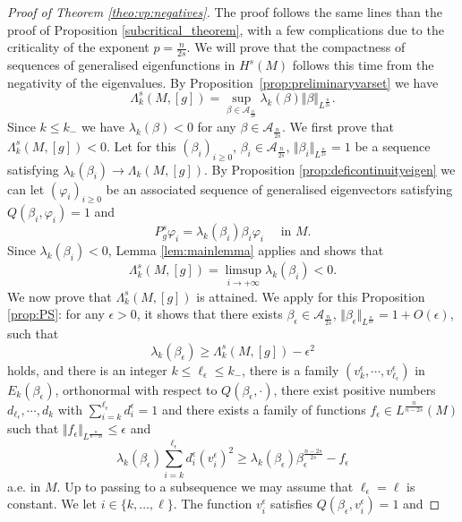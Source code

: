 \documentclass[10pt]{amsart}
\numberwithin{equation}{section}
\newcommand{\vp}{\varphi}
\theoremstyle{plain}
\theoremstyle{remark}
\begin{document}
\begin{proof}[Proof of Theorem \ref{theo:vp:negatives}]
The proof follows the same lines than the proof of Proposition \ref{subcritical_theorem}, with a few complications due to the criticality of the exponent $p = \frac{n}{2s}$. We will prove that the compactness of sequences of generalised eigenfunctions in $H^s(M)$ follows this time from the negativity of the eigenvalues. By Proposition~\ref{prop:preliminaryvarset} we have 
$$ \Lambda_k^s(M,[g]) = \sup_{\beta \in \mathcal{A}_{\frac{n}{2s}}} \lambda_k(\beta) \Vert \beta \Vert_{L^\frac{n}{2s}}. $$
Since $k \le k_{-}$ we have $\lambda_k(\beta) <0$ for any $\beta \in \mathcal{A}_{\frac{n}{2s}}$.  We first prove that $\Lambda_k^s(M,[g])<0$. Let for this $(\beta_i)_{i \ge0}$, $\beta_i \in \mathcal{A}_{\frac{n}{2s}}$, $\Vert \beta_i \Vert_{L^{\frac{n}{2s}}}=1$ be a sequence satisfying $ \lambda_k(\beta_i) \to \Lambda_k(M,[g])$. By Proposition \ref{prop:deficontinuityeigen} we can let $(\vp_i)_{i\ge0}$ be an associated sequence of generalised eigenvectors satisfying $Q(\beta_i, \vp_i) = 1$ and 
$$ P_g^s \vp_i = \lambda_k(\beta_i) \beta_i \vp_i \quad \text{ in } M. $$
Since $\lambda_k(\beta_i) <0$, Lemma \ref{lem:mainlemma} applies and shows that 
$$\Lambda_k^s(M,[g]) = \limsup_{i \to + \infty} \lambda_k(\beta_i) <0.$$ 
We now prove that $\Lambda_k^s(M,[g])$ is attained. We apply for this Proposition \ref{prop:PS}: for any $\epsilon >0$, it shows that there exists $\beta_\epsilon \in \mathcal{A}_{\frac{n}{2s}}$, $\Vert \beta_\epsilon \Vert_{L^\frac{n}{2s}} = 1 + O(\epsilon)$, such that  
\begin{equation} \label{eq:vp:neg:1}
 \lambda_k(\beta_{\epsilon}) \geq  \Lambda_k^s(M,[g]) - \epsilon^2 
 \end{equation}
holds, and there is an integer $k \le \ell_\epsilon \leq k_-$, there is a family $(v_{k}^\epsilon,\cdots,v_{\ell_\epsilon}^\epsilon) $ in $E_k(\beta_\epsilon)$, orthonormal with respect to $Q(\beta_\epsilon,\cdot)$, there exist positive numbers $d_{\ell_\epsilon},\cdots, d_k$ with $\sum_{i=k}^{\ell_\epsilon} d_i^\epsilon = 1$ and there exists a family of functions $f_\epsilon \in L^{\frac{n}{n-2s}}(M)$ such that $ \Vert f_\epsilon \Vert_{L^{\frac{n}{n-2s}}} \leq \epsilon $ and
\begin{equation} \label{eq:vp:neg:2} 
 \lambda_k(\beta_\epsilon) \sum_{i=k}^{\ell_\epsilon} d_i^\epsilon \left(v_i^\epsilon\right)^2 \geq \lambda_k(\beta_\epsilon)\beta_\epsilon^{\frac{n-2s}{2s}} - f_\epsilon 
 \end{equation}
 a.e. in $M$. Up to passing to a subsequence we may assume that $\ell_\epsilon = \ell$ is constant. We let $i \in \{k, \dots, \ell\}$. The function $v_i^\epsilon$ satisfies $Q(\beta_\epsilon, v_i^{\epsilon}) = 1$ and 

\end{proof}
\end{document}
